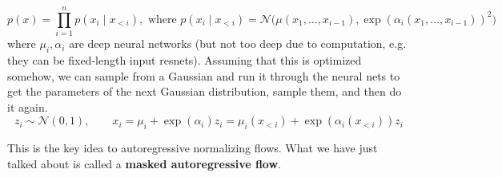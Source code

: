   \begin{equation}
    p(x) = \prod_{i=1}^n p(x_i \mid x_{<i}), \text{ where } p(x_i \mid x_{<i}) = \mathcal{N} \big( \mu(x_1, \ldots, x_{i-1}), \exp(\alpha_i (x_1, \ldots, x_{i-1}))^2 \big) 
  \end{equation}
  where $\mu_i, \alpha_i$ are deep neural networks (but not too deep due to computation, e.g. they can be fixed-length input resnets). Assuming that this is optimized somehow, we can sample from a Gaussian and run it through the neural nets to get the parameters of the next Gaussian distribution, sample them, and then do it again. 
  \begin{equation}
    z_i \sim \mathcal{N}(0, 1), \qquad x_i = \mu_i + \exp(\alpha_i) z_i = \mu_i (x_{<i}) + \exp(\alpha_i (x_{<i})) z_i 
  \end{equation}

  This is the key idea to autoregressive normalizing flows. What we have just talked about is called a \textbf{masked autoregressive flow}. 

